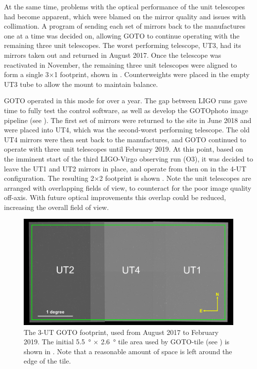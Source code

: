 \begin{colsection}
At the same time, problems with the optical performance of the unit telescopes had become apparent, which were blamed on the mirror quality and issues with collimation. A program of sending each set of mirrors back to the manufactures one at a time was decided on, allowing GOTO to continue operating with the remaining three unit telescopes. The worst performing telescope, UT3, had its mirrors taken out and returned in August 2017. Once the telescope was reactivated in November, the remaining three unit telescopes were aligned to form a single 3$\times$1 footprint, shown in . Counterweights were placed in the empty UT3 tube to allow the mount to maintain balance.

GOTO operated in this mode for over a year. The gap between LIGO runs gave time to fully test the control software, as well as develop the GOTOphoto image pipeline (see ). The first set of mirrors were returned to the site in June 2018 and were placed into UT4, which was the second-worst performing telescope. The old UT4 mirrors were then sent back to the manufactures, and GOTO continued to operate with three unit telescopes until February 2019. At this point, based on the imminent start of the third LIGO-Virgo observing run (O3), it was decided to leave the UT1 and UT2 mirrors in place, and operate from then on in the 4-UT configuration. The resulting 2$\times$2 footprint is shown . Note the unit telescopes are arranged with overlapping fields of view, to counteract for the poor image quality off-axis. With future optical improvements this overlap could be reduced, increasing the overall field of view.

\begin{figure}[p]
    \begin{center}
        \includegraphics[width=0.7\linewidth]{images/footprint_1_box.png}
    \end{center}
    \caption[The previous 3-UT GOTO footprint]{
        The 3-UT GOTO footprint, used from August 2017 to February 2019.
        The initial \SI{5.5}{\degree} $\times$ \SI{2.6}{\degree} tile area used by GOTO-tile (see ) is shown in . Note that a reasonable amount of space is left around the edge of the tile.
    }\label{fig:3ut_footprint}
\end{figure}


\end{colsection}

